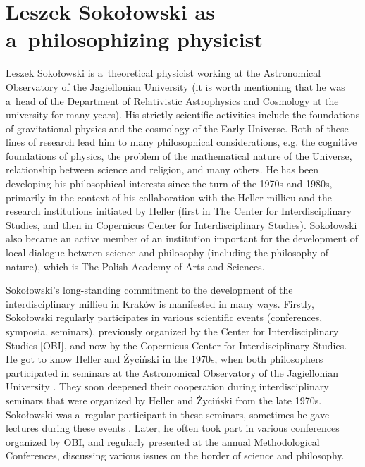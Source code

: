 \section{Leszek Sokołowski as a~philosophizing physicist}

Leszek Sokołowski is a~theoretical physicist working at the Astronomical Observatory of the Jagiellonian University (it is worth mentioning that he was a~head of the Department of Relativistic Astrophysics and Cosmology at the university for many years). His strictly scientific activities include the foundations of gravitational physics and the cosmology of the Early Universe. Both of these lines of research lead him to many philosophical considerations, e.g. the cognitive foundations of physics, the problem of the mathematical nature of the Universe, relationship between science and religion, and many others. He has been developing his philosophical interests since the turn of the 1970s and 1980s, primarily in the context of his collaboration with the Heller millieu and the research institutions initiated by Heller (first in The Center for Interdisciplinary Studies, and then in Copernicus Center for Interdisciplinary Studies). Sokołowski also became an active member of an institution important for the development of local dialogue between science and philosophy (including the philosophy of nature), which is The Polish Academy of Arts and Sciences.



Sokołowski's long-standing commitment to the development of the interdisciplinary millieu in Kraków is manifested in many ways. Firstly, Sokołowski regularly participates in various scientific events (conferences, symposia, seminars), previously organized by the Center for Interdisciplinary Studies [OBI], and now by the Copernicus Center for Interdisciplinary Studies. He got to know Heller and Życiński in the 1970s, when both philosophers participated in seminars at the Astronomical Observatory of the Jagiellonian University 
\parencite[][]{}. %
 They soon deepened their cooperation during interdisciplinary seminars that were organized by Heller and Życiński from the late 1970s. Sokołowski was a~regular participant in these seminars, sometimes he gave lectures during these events 
\parencite[][]{Liana1999Z}. %
 Later, he often took part in various conferences organized by OBI, and regularly presented at the annual Methodological Conferences, discussing various issues on the border of science and philosophy.



